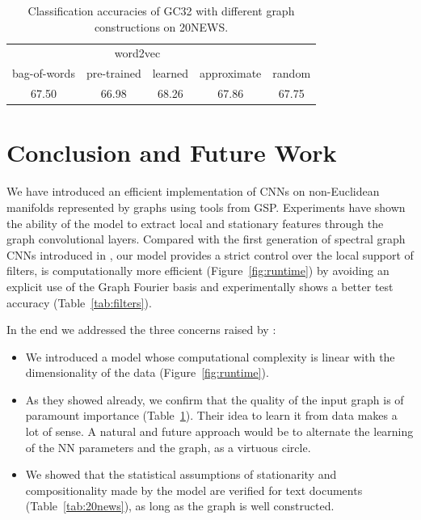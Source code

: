 \documentclass{article}
\newcommand{\figref}[1]{Figure~\ref{fig:#1}}
\newcommand{\tabref}[1]{Table~\ref{tab:#1}}
\newcommand{\bruna}{art:BrunaZarembaSzlamLeCun13DLgraphs,
art:HenaffBrunaLeCun15DLgraphs}
\newcommand{\todo}[1]{{\color{red} #1 }}
\begin{document}
\begin{table}[h!] \centering
\begin{tabular}{ccccc} \toprule
& \multicolumn{2}{c}{word2vec} & & \\
bag-of-words & pre-trained & learned & approximate & random \\
\midrule
67.50 & \todo{66.98} & 68.26 & 67.86 & 67.75 \\
\bottomrule \end{tabular}
\caption{Classification accuracies of GC32 with different graph constructions on 20NEWS.} 
\label{tab4b}
\label{tab:20news_quality}
\end{table}

\section{Conclusion and Future Work}

We have introduced an efficient implementation of CNNs on non-Euclidean
manifolds represented by graphs using tools from GSP. Experiments have shown the
ability of the model to extract local and stationary features through the graph
convolutional layers. Compared with the first generation of spectral graph CNNs
introduced in \cite{\bruna}, our model provides a strict control over the local
support of filters, is computationally more efficient (\figref{runtime}) by
avoiding an explicit use of the Graph Fourier basis and experimentally shows a
better test accuracy (\tabref{filters}).

In the end we addressed the three concerns raised by
\cite{art:HenaffBrunaLeCun15DLgraphs}:
\begin{itemize}
\item We introduced a model whose computational complexity is linear with the
	dimensionality of the data (\figref{runtime}).
\item As they showed already, we confirm that the quality of the input graph is
	of paramount importance (\tabref{20news_quality}).  Their idea to learn it
	from data makes a lot of sense. A natural and future approach would be to
	alternate the learning of the NN parameters and the graph, as a virtuous
	circle.
\item We showed that the statistical assumptions of stationarity and
	compositionality made by the model are verified for text documents
	(\tabref{20news}), as long as the graph is well constructed.
\end{itemize}
\end{document}
